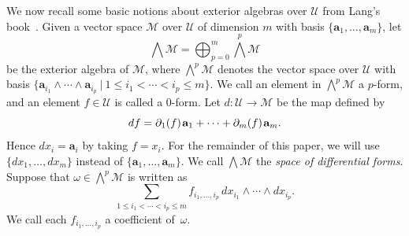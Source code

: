\documentclass{amsart}
\theoremstyle{definition}
\numberwithin{equation}{section}
\numberwithin{thm}{section}
\begin{document}
We now recall some basic notions about exterior algebras over $\mathcal{U}$ from Lang's book~\cite[Ch.~XIX]{SergeAlgebra}. Given a vector space ${\mathcal{M}}$ 
over $\mathcal{U}$ of dimension $m$ with basis $\{\mathbf{a}_1,\ldots,\mathbf{a}_m\}$, let
\[
	\bigwedge \mathcal{M} = \bigoplus_{p=0}^m {\bigwedge}^p {\mathcal{M}}
\]
be the exterior algebra of $\mathcal{M}$, where $\bigwedge^p \mathcal{M}$ denotes the vector space over $\mathcal{U}$ with basis $\{\mathbf{a}_{i_1} \wedge \cdots \wedge \mathbf{a}_{i_p} \ | \ 1 \leq i_1 < \cdots < i_p \leq m\}$. We call an element in $\bigwedge^p \mathcal{M}$ a $p$-form, and an element $f \in \mathcal{U}$ is called a  $0$-form. Let $d \colon \mathcal{U} \rightarrow \mathcal{M}$ be the map defined by
\[
	d\hskip.01pt f = \partial_1 (f) \hskip1pt \mathbf{a}_1 + \cdots + \partial_m(f)\hskip1pt  \mathbf{a}_m.
\]
Hence $dx_i = \mathbf{a}_i$ by taking $f= x_i$. For the remainder of this paper, we will use $\{ dx_1, \ldots, dx_m\}$ instead of $\{\mathbf{a}_1,\ldots, \mathbf{a}_m\}$. We call $\bigwedge \mathcal{M}$ the \textit{space of differential forms}.
Suppose that $\omega \in {\bigwedge}^p \mathcal{M} $ is written as  
\begin{equation}\label{EQ:pform}
    \sum_{1 \leq i_1 < \cdots < i_p \leq m} f_{i_1,\ldots,i_p} \,dx_{i_1}\wedge \cdots \wedge dx_{i_p}. 
\end{equation}
We call each $f_{i_1,\ldots,i_p}$ a coefficient of~$\omega$.
\end{document}
